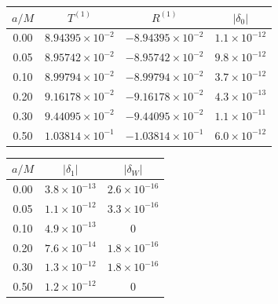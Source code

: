 \documentclass[UTF8,fontset=fandol,11pt,a4paper,oneside]{ctexart}
\numberwithin{equation}{section}
\begin{document}
\noindent\begin{minipage}{\linewidth}
\captionsetup{type=table}\caption{旋转趋零与 Schwarzschild 的归一化连续性比较。}\label{audit:tab:spin-limit}
\centering\fontsize{10}{13.5}\selectfont
\setlength{\tabcolsep}{6pt}\renewcommand{\arraystretch}{1.2}
\par{}\par\smallskip
\begin{tabular}{cccc}\toprule
$a/M$ & $T^{(1)}$ & $R^{(1)}$ & $|\delta_0|$\\\midrule
0.00 & $8.94395\times10^{-2}$ & $-8.94395\times10^{-2}$ & $1.1\times10^{-12}$\\
0.05 & $8.95742\times10^{-2}$ & $-8.95742\times10^{-2}$ & $9.8\times10^{-12}$\\
0.10 & $8.99794\times10^{-2}$ & $-8.99794\times10^{-2}$ & $3.7\times10^{-12}$\\
0.20 & $9.16178\times10^{-2}$ & $-9.16178\times10^{-2}$ & $4.3\times10^{-13}$\\
0.30 & $9.44095\times10^{-2}$ & $-9.44095\times10^{-2}$ & $1.1\times10^{-11}$\\
0.50 & $1.03814\times10^{-1}$ & $-1.03814\times10^{-1}$ & $6.0\times10^{-12}$\\
\bottomrule\end{tabular}
\par\medskip
\par{}\par\smallskip
\begin{tabular}{ccc}\toprule
$a/M$ & $|\delta_1|$ & $|\delta_W|$\\\midrule
0.00 & $3.8\times10^{-13}$ & $2.6\times10^{-16}$\\
0.05 & $1.1\times10^{-12}$ & $3.3\times10^{-16}$\\
0.10 & $4.9\times10^{-13}$ & $0$\\
0.20 & $7.6\times10^{-14}$ & $1.8\times10^{-16}$\\
0.30 & $1.3\times10^{-12}$ & $1.8\times10^{-16}$\\
0.50 & $1.2\times10^{-12}$ & $0$\\
\bottomrule\end{tabular}
\end{minipage}\par\addvspace{10pt}\clearpage{}
\end{document}
